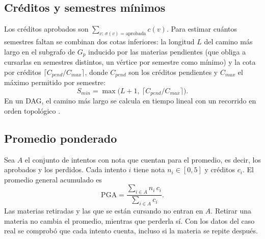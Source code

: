 \documentclass[11pt,a4paper]{article}
\begin{document}
\subsection{Créditos y semestres mínimos}
Los créditos aprobados son $\sum_{v:\,\sigma(v)=\text{aprobada}} c(v)$. Para estimar cuántos semestres faltan se combinan dos cotas inferiores: la longitud $L$ del camino más largo en el subgrafo de $G_p$ inducido por las materias pendientes (que obliga a cursarlas en semestres distintos, un vértice por semestre como mínimo) y la cota por créditos $\lceil C_{pend}/C_{max}\rceil$, donde $C_{pend}$ son los créditos pendientes y $C_{max}$ el máximo permitido por semestre:
\[
S_{min}=\max\big(L+1,\ \lceil C_{pend}/C_{max}\rceil\big).
\]
En un DAG, el camino más largo se calcula en tiempo lineal con un recorrido en orden topológico \parencite{cormen2022}.

\subsection{Promedio ponderado}
Sea $A$ el conjunto de intentos con nota que cuentan para el promedio, es decir, los aprobados y los perdidos. Cada intento $i$ tiene nota $n_i\in[0,5]$ y créditos $c_i$. El promedio general acumulado es
\[
\mathrm{PGA}=\frac{\sum_{i\in A} n_i\,c_i}{\sum_{i\in A} c_i}.
\]
Las materias retiradas y las que se están cursando no entran en $A$. Retirar una materia no cambia el promedio, mientras que perderla sí. Con los datos del caso real se comprobó que cada intento cuenta, incluso si la materia se repite después.
\end{document}
